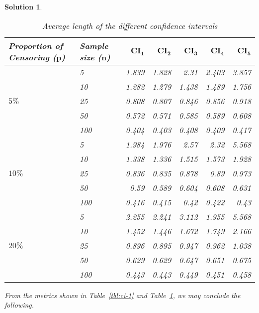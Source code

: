 \documentclass[12pt]{article}
\theoremstyle{problemstyle}
\newtheorem*{solution*}{Solution}
\begin{document}
\begin{solution*}
\begin{table}[ht]
    \centering
    \begin{tabular}{llrrrrr}
        \toprule
        Proportion of Censoring ($\mathbf{p}$) & Sample size ($\mathbf{n}$) & $\mathbf{CI_1}$ & $\mathbf{CI_2}$ & $\mathbf{CI_3}$ & $\mathbf{CI_4}$ & $\mathbf{CI_5}$\\
        \midrule
        \multirow{5}{*}{$5\%$} & 5 & 1.839 & 1.828 & 2.31 & 2.403 & 3.857 \\
        & 10 & 1.282 & 1.279 & 1.438 & 1.489 & 1.756 \\
        & 25 & 0.808 & 0.807 & 0.846 & 0.856 & 0.918 \\
        & 50 & 0.572 & 0.571 & 0.585 & 0.589 & 0.608 \\
        & 100 & 0.404 & 0.403 & 0.408 & 0.409 & 0.417 \\
        \midrule
        \multirow{5}{*}{$10\%$} & 5 & 1.984 & 1.976 & 2.57 & 2.32 & 5.568 \\
        & 10 & 1.338 & 1.336 & 1.515 & 1.573 & 1.928 \\
        & 25 & 0.836 & 0.835 & 0.878 & 0.89 & 0.973 \\
        & 50 & 0.59 & 0.589 & 0.604 & 0.608 & 0.631 \\
        & 100 & 0.416 & 0.415 & 0.42 & 0.422 & 0.43 \\
        \midrule
        \multirow{5}{*}{$20\%$} & 5 & 2.255 & 2.241 & 3.112 & 1.955 & 5.568 \\
        & 10 & 1.452 & 1.446 & 1.672 & 1.749 & 2.166 \\
        & 25 & 0.896 & 0.895 & 0.947 & 0.962 & 1.038 \\
        & 50 & 0.629 & 0.629 & 0.647 & 0.651 & 0.675 \\
        & 100 & 0.443 & 0.443 & 0.449 & 0.451 & 0.458 \\
        \bottomrule
    \end{tabular}
    \caption{Average length of the different confidence intervals}
    \label{tbl:ci-2}
\end{table}

From the metrics shown in Table~\ref{tbl:ci-1} and Table~\ref{tbl:ci-2}, we may conclude the following.


\end{solution*}
\end{document}
